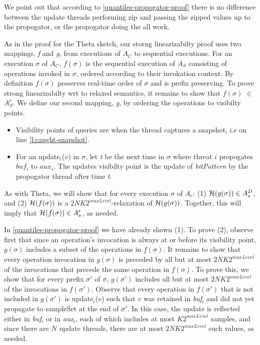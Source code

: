 We point out that according to \ref{quantiles-propogator-proof} there is no difference between the update
threads performing zip and passing the zipped values up to the propogator, or the propogator doing the all work.

As in the proof for the Theta sketch, our storng linearizabilty proof uses two mappings, \emph{f} and \emph{g},
from executions of $A_C$ to sequential executions. For an execution $\sigma$ of $A_C$, $f(\sigma)$ is the sequential
execution of $A_S$ consisting of operations invoked in $\sigma$, ordered according to their invokation context. By
definition $f(\sigma)$ preserves real-time order of $\sigma$ and is prefix preserving. To prove strong linearizabilty
wrt to relaxed semantics, it remains to show that $f(\sigma)$ $\in$ $A_S^r$.
We define our second mapping, \emph{g}, by ordering the operations to visibilty points.
\begin{itemize}
	\item
	Visibility points of queries are when the thread captures a snapshot, i.e on line \ref{l:caught-snapshot}.
	\item
	For an update$_i$($v$) in $\sigma$, let \emph{t} be the next time in $\sigma$ where threat $i$ propogates
	$buf_i$ to $aux_i$. The updates visibilty point is the update of \emph{bitPattern} by the propogator thread
	after time \emph{t}.
	\end{itemize}

As with Theta, we will show that for every execution $\sigma$ of $A_c$:
(1) ${\cal H}(g(\sigma)) \in A^D_s$, and 
(2)  ${\cal H}(f(\sigma))$ is a $2NK2^{maxLevel}$-relaxation of ${\cal H}(g(\sigma))$.  
Together, this will imply that ${\cal H}(f(\sigma)) \in A^{r}_s$, as needed.

In \ref{quantiles-propogator-proof} we have already shown (1).
To prove (2), observe first that since an operation's invocation is always at or before its 
visibility point, $g(\sigma)$ includes a subset of the operations in $f(\sigma)$. 
It remains to show  that every operation invocation in $g(\sigma)$ is preceded by all 
but at most $2NK2^{maxLevel}$  of the invocations that precede the same operation in $f(\sigma)$. 
To prove this, we show that for every prefix $\sigma'$ of $\sigma$, $g(\sigma')$ includes all 
but at most $2NK2^{maxLevel}$  of the invocations in $f(\sigma')$.
Observe that 
every operation in $f(\sigma')$ that is not included in $g(\sigma')$ is update$_i$($v$) such that $v$
was  retained in \emph{buf$_i$} and did not yet propagate to sampleSet at the end of $\sigma'$. 
In this case, the update is reflected either in \emph{buf$_i$} or in  \emph{aux$_i$}, each of which 
includes at most $K2^{maxLevel}$ samples, and since there are $N$ update threads, there are at most
$2NK2^{maxLevel}$ such values, as needed.


